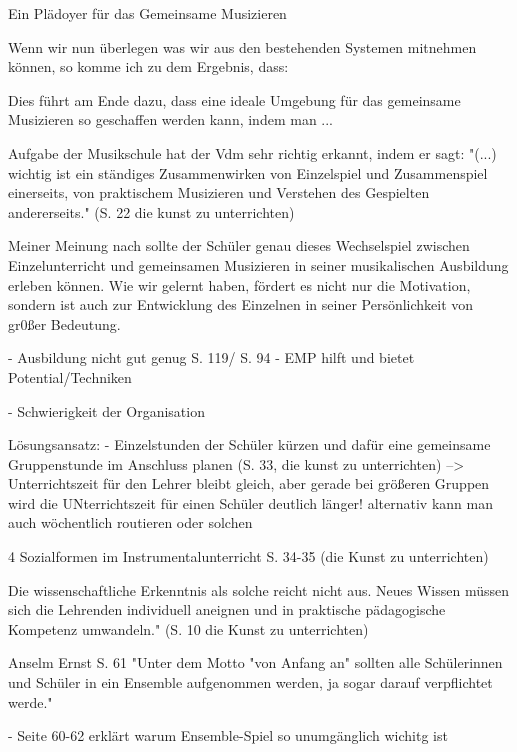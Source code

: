 Ein Plädoyer für das Gemeinsame Musizieren

Wenn wir nun überlegen was wir aus den bestehenden Systemen mitnehmen können, so
komme ich zu dem Ergebnis, dass: 

Dies führt am Ende dazu, dass eine ideale Umgebung für das gemeinsame Musizieren
so geschaffen werden kann, indem man ...

Aufgabe der Musikschule hat der Vdm sehr richtig erkannt, indem er sagt: "(...)
wichtig ist ein ständiges Zusammenwirken von Einzelspiel und Zusammenspiel
einerseits, von praktischem Musizieren und Verstehen des Gespielten
andererseits." (S. 22 die kunst zu unterrichten)

Meiner Meinung nach sollte der Schüler genau dieses Wechselspiel zwischen
Einzelunterricht und gemeinsamen Musizieren in seiner musikalischen Ausbildung
erleben können. Wie wir gelernt haben, fördert es nicht nur die Motivation,
sondern ist auch zur Entwicklung des Einzelnen in seiner Persönlichkeit von
gr0ßer Bedeutung. 


- Ausbildung nicht gut genug S. 119/ S. 94
- EMP hilft und bietet Potential/Techniken

- Schwierigkeit der Organisation

Lösungsansatz:
- Einzelstunden der Schüler kürzen und dafür eine gemeinsame Gruppenstunde im
Anschluss planen (S. 33, die kunst zu unterrichten)
--> Unterrichtszeit für den Lehrer bleibt gleich, aber gerade bei größeren
Gruppen wird die UNterrichtszeit für einen Schüler deutlich länger!
    alternativ kann man auch wöchentlich routieren oder solchen


4 Sozialformen im Instrumentalunterricht S. 34-35    (die Kunst zu unterrichten)

Die wissenschaftliche Erkenntnis als solche reicht nicht aus. Neues Wissen
müssen sich die Lehrenden individuell aneignen und in praktische pädagogische
Kompetenz umwandeln." (S. 10 die Kunst zu unterrichten)

Anselm Ernst S. 61 "Unter dem Motto "von Anfang an" sollten alle Schülerinnen und
Schüler in ein Ensemble aufgenommen werden, ja sogar darauf verpflichtet werde."

- Seite 60-62 erklärt warum Ensemble-Spiel so unumgänglich wichitg ist
